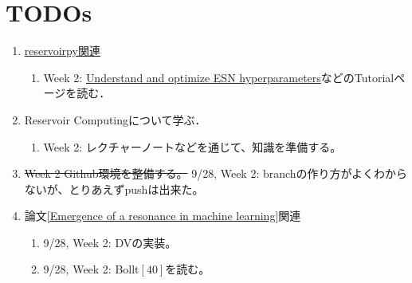 \section{TODOs}
\begin{enumerate}
  \item \href{https://github.com/reservoirpy/reservoirpy}{reservoirpy関連}
  \begin{enumerate}
  \item Week 2: \href{https://github.com/reservoirpy/reservoirpy/blob/master/tutorials/4-Understand_and_optimize_hyperparameters.ipynb}{Understand and optimize ESN hyperparameters}などのTutorialページを読む．
  \end{enumerate}
  \item Reservoir Computingについて学ぶ．\begin{enumerate}
    \item Week 2: レクチャーノートなどを通じて、知識を準備する。
  \end{enumerate}
  \item \sout{Week 2 Github環境を整備する。} 9/28, Week 2: branchの作り方がよくわからないが、とりあえずpushは出来た。
  \item 論文\ref{Emergence of a resonance in machine learning}関連
    \begin{enumerate}
    \item 9/28, Week 2: DVの実装。
    \item 9/28, Week 2: Bollt$[40]$を読む。
  \end{enumerate}
\end{enumerate}